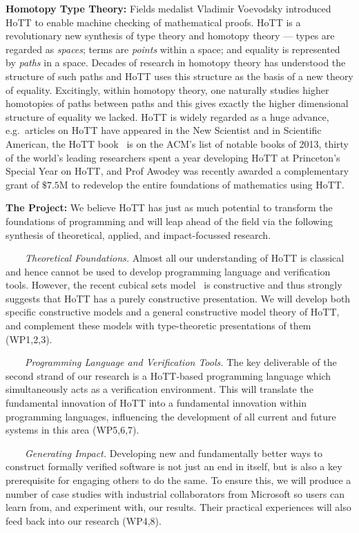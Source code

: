 \documentclass[a4paper,11pt]{article}
\newcommand{\eg}{{e.g.}\ }
\begin{document}
{\bf Homotopy Type Theory:} Fields medalist Vladimir Voevodsky
introduced HoTT to enable machine checking of mathematical proofs.
HoTT is a revolutionary new synthesis of type theory and homotopy
theory --- types are regarded as \emph{spaces}; terms are
\emph{points} within a space; and equality is represented by
\emph{paths} in a space. Decades of research in homotopy theory has
understood the structure of such paths and HoTT uses this structure as
the basis of a new theory of equality. Excitingly, within homotopy
theory, one naturally studies higher homotopies of paths between paths
and this gives exactly the higher dimensional structure of equality we
lacked.  HoTT is widely regarded as a huge advance, \eg articles on
HoTT have appeared in the New Scientist and in Scientific American,
the HoTT book~\cite{hott-book} is on the ACM's list of notable books
of 2013, thirty of the world's leading researchers spent a year
developing HoTT at Princeton's Special Year on HoTT, and Prof Awodey
was recently awarded a complementary grant of $\$ 7.5$M to redevelop
the entire foundations of mathematics using HoTT.


{\bf The Project:} We believe HoTT has just as much potential to
transform the foundations of programming and will leap
ahead of the field via the following
synthesis of theoretical, applied, and impact-focussed research.

$\;\;\; \;\;\;$ {\em Theoretical Foundations.} 
Almost all our understanding of HoTT is classical and hence
cannot be used to develop programming language and verification
tools. However, the recent cubical sets model~\cite{BezemM:cubsmt,nominal} is constructive and
thus strongly suggests that HoTT has a purely constructive
presentation. We will develop both specific constructive models and a
general constructive model theory of HoTT, and complement these models
with type-theoretic presentations of them (WP1,2,3).

$\;\;\;\;\;\;$ {\em Programming Language and Verification Tools.} The key
  deliverable of the second strand of our research is a HoTT-based
  programming language which simultaneously acts as a verification
  environment. This will translate the fundamental innovation of HoTT
  into a fundamental innovation within programming languages,
  influencing the development of all current and future systems in
  this area (WP5,6,7).

  $\;\;\;\;\;\;$ {\em Generating Impact.} Developing new and
  fundamentally better ways to construct formally verified software is
  not just an end in itself, but is also a key prerequisite for
  engaging others to do the same.  To ensure this, we will produce a
  number of case studies with industrial collaborators from Microsoft so users can
  learn from, and experiment with, our results. Their practical
  experiences will also feed back into our research (WP4,8).
\end{document}
